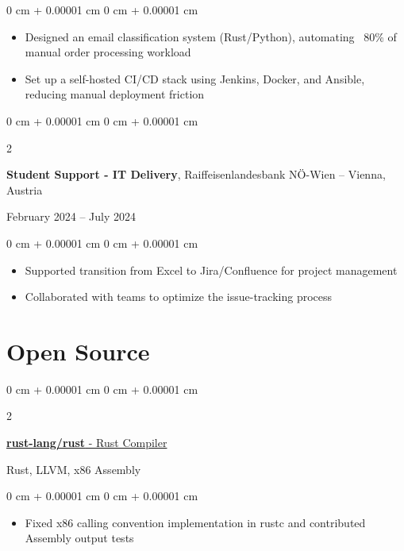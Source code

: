 \documentclass[10pt, letterpaper]{article}
\newenvironment{highlights}{
    \begin{itemize}[
        topsep=0.10 cm,
        parsep=0.10 cm,
        partopsep=0pt,
        itemsep=0pt,
        leftmargin=0 cm + 10pt
    ]
}{
    \end{itemize}
}
\newenvironment{onecolentry}{
    \begin{adjustwidth}{
        0 cm + 0.00001 cm
    }{
        0 cm + 0.00001 cm
    }
}{
    \end{adjustwidth}
}
\newenvironment{twocolentry}[2][]{
    \onecolentry
    \def\secondColumn{#2}
    \setcolumnwidth{\fill, 4.5 cm}
    \begin{paracol}{2}
}{
    \switchcolumn \raggedleft \secondColumn
    \end{paracol}
    \endonecolentry
}
\begin{document}
    \vspace{0.05 cm}
    
    \begin{onecolentry}
        \begin{highlights}
            \item Designed an email classification system (Rust/Python), automating ~80\% of manual order processing workload
            \item Set up a self-hosted CI/CD stack using Jenkins, Docker, and Ansible, reducing manual deployment friction
        \end{highlights}
    \end{onecolentry}

    \vspace{0.15 cm}

    \begin{twocolentry}
        {February 2024 – July 2024}
        \textbf{Student Support - IT Delivery}, Raiffeisenlandesbank NÖ-Wien -- Vienna, Austria
    \end{twocolentry}

    \vspace{0.05 cm}

    \begin{onecolentry}
        \begin{highlights}
            \item Supported transition from Excel to Jira/Confluence for project management
            \item Collaborated with teams to optimize the issue-tracking process
        \end{highlights}
    \end{onecolentry}

    \section{Open Source}

     \begin{twocolentry}
        {Rust, LLVM, x86 Assembly}
        \href{https://github.com/rust-lang/rust/}{\textbf{rust-lang/rust} - Rust Compiler}
    \end{twocolentry}

    \vspace{0.05 cm}
    
    \begin{onecolentry}
        \begin{highlights}
            \item Fixed x86 calling convention implementation in rustc and contributed Assembly output tests
        \end{highlights}
    \end{onecolentry}
\end{document}
